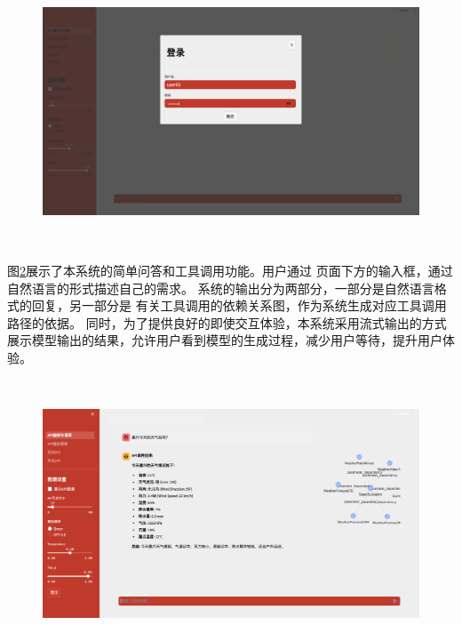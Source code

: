 \begin{figure}[H]
  \vspace{1em}
  \centering
  \setlength{\abovecaptionskip}{10pt} %
  \includegraphics[height=8cm]{../assets/ch6-1登陆.png}
  \label{fig:ch6-login}
\end{figure}

图\ref{fig:ch6-simple-question}展示了本系统的简单问答和工具调用功能。用户通过
页面下方的输入框，通过自然语言的形式描述自己的需求。
系统的输出分为两部分，一部分是自然语言格式的回复，另一部分是
有关工具调用的依赖关系图，作为系统生成对应工具调用路径的依据。
同时，为了提供良好的即使交互体验，本系统采用流式输出的方式展示模型输出的结果，允许用户看到模型的生成过程，减少用户等待，提升用户体验。

\begin{figure}[H]
  \vspace{1em}
  \centering
  \setlength{\abovecaptionskip}{10pt} %
  \includegraphics[height=8cm]{../assets/ch6-2简单问题回答.png}
  \label{fig:ch6-simple-question}
\end{figure}

